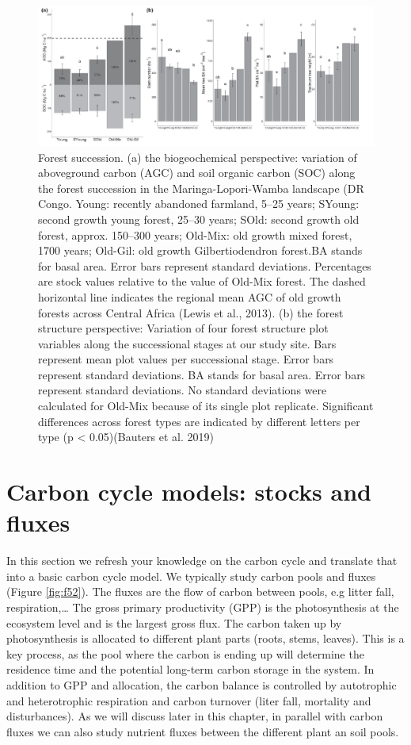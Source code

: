 \documentclass[12pt,oneside]{book}
\begin{document}
\begin{figure}

{\centering \includegraphics[width=0.8\linewidth]{figures/chap5/f51_bauters} 

}

\caption{Forest succession. (a) the biogeochemical perspective: variation of aboveground carbon (AGC) and soil organic carbon (SOC) along the forest succession in the Maringa-Lopori-Wamba landscape (DR Congo. Young: recently abandoned farmland, 5–25 years; SYoung: second growth young forest, 25–30 years; SOld: second growth old forest, approx. 150–300 years; Old-Mix: old growth mixed forest, 1700 years; Old-Gil: old growth Gilbertiodendron forest.BA stands for basal area. Error bars represent standard deviations. Percentages are stock values relative to the value of Old-Mix forest. The dashed horizontal line indicates the regional mean AGC of old growth forests across Central Africa (Lewis et al., 2013). (b) the forest structure perspective: Variation of four forest structure plot variables along the successional stages at our study site. Bars represent mean plot values per successional stage. Error bars represent standard deviations. BA stands for basal area. Error bars represent standard deviations. No standard deviations were calculated for Old-Mix because of its single plot replicate. Significant differences across forest types are indicated by different letters per type (p < 0.05)(Bauters et al. 2019)}\label{fig:f51}
\end{figure}

\section{Carbon cycle models: stocks and
fluxes}\label{carbon-cycle-models-stocks-and-fluxes}

In this section we refresh your knowledge on the carbon cycle and
translate that into a basic carbon cycle model. We typically study
carbon pools and fluxes (Figure \ref{fig:f52}). The fluxes are the flow
of carbon between pools, e.g litter fall, respiration,\ldots{} The gross
primary productivity (GPP) is the photosynthesis at the ecosystem level
and is the largest gross flux. The carbon taken up by photosynthesis is
allocated to different plant parts (roots, stems, leaves). This is a key
process, as the pool where the carbon is ending up will determine the
residence time and the potential long-term carbon storage in the system.
In addition to GPP and allocation, the carbon balance is controlled by
autotrophic and heterotrophic respiration and carbon turnover (liter
fall, mortality and disturbances). As we will discuss later in this
chapter, in parallel with carbon fluxes we can also study nutrient
fluxes between the different plant an soil pools.
\end{document}
